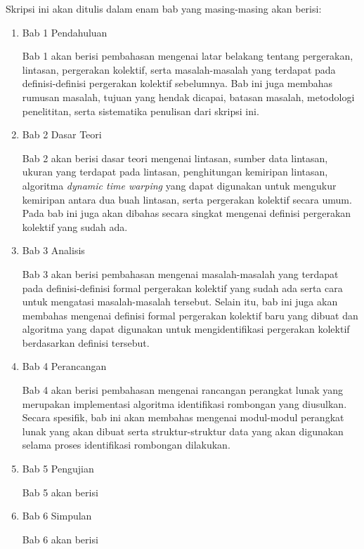 Skripsi ini akan ditulis dalam enam bab yang masing-masing akan berisi:

\begin{enumerate}
    \item Bab 1 Pendahuluan
    
    Bab 1 akan berisi pembahasan mengenai latar belakang tentang pergerakan, lintasan, pergerakan kolektif, serta masalah-masalah yang terdapat pada definisi-definisi pergerakan kolektif sebelumnya. Bab ini juga membahas rumusan masalah, tujuan yang hendak dicapai, batasan masalah, metodologi penelititan, serta sistematika penulisan dari skripsi ini.
    
    \item Bab 2 Dasar Teori
    
    Bab 2 akan berisi dasar teori mengenai lintasan, sumber data lintasan, ukuran yang terdapat pada lintasan, penghitungan kemiripan lintasan, algoritma \textit{dynamic time warping} yang dapat digunakan untuk mengukur kemiripan antara dua buah lintasan, serta pergerakan kolektif secara umum. Pada bab ini juga akan dibahas secara singkat mengenai definisi pergerakan kolektif yang sudah ada.
    
    \item Bab 3 Analisis
    
    Bab 3 akan berisi pembahasan mengenai masalah-masalah yang terdapat pada definisi-definisi formal pergerakan kolektif yang sudah ada serta cara untuk mengatasi masalah-masalah tersebut. Selain itu, bab ini juga akan membahas mengenai definisi formal pergerakan kolektif baru yang dibuat dan algoritma yang dapat digunakan untuk mengidentifikasi pergerakan kolektif berdasarkan definisi tersebut.
    
    \item Bab 4 Perancangan
    
    Bab 4 akan berisi pembahasan mengenai rancangan perangkat lunak yang merupakan implementasi algoritma identifikasi rombongan yang diusulkan. Secara spesifik, bab ini akan membahas mengenai modul-modul perangkat lunak yang akan dibuat serta struktur-struktur data yang akan digunakan selama proses identifikasi rombongan dilakukan.
    
    \item Bab 5 Pengujian
    
    Bab 5 akan berisi
    
    \item Bab 6 Simpulan
    
    Bab 6 akan berisi
\end{enumerate}
